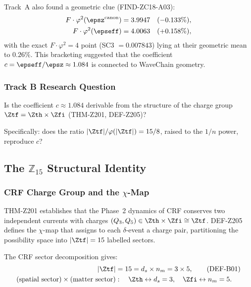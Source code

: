 \documentclass[12pt, a4paper]{article}
\begin{document}
Track~A also found a geometric clue (FIND-ZC18-A03):
\begin{align}
  F\cdot\varphi^2(\epsz^{\rm canon}) &= 3.9947 \quad (-0.133\%),
  \notag\\
  F\cdot\varphi^2(\epseff) &= 4.0063 \quad (+0.158\%),
  \notag
\end{align}
with the exact $F\cdot\varphi^2=4$ point (SC3 $= 0.007843$) lying at
their geometric mean to $0.26\%$.
This bracketing suggested that the coefficient
$c = \epseff/\epsz \approx 1.084$ is connected to WaveChain geometry.

\subsubsection{Track B Research Question}

\begin{formalbox}[title={Track B Question (from ZC18 Track~A, CONJ-ZC18-A01)}]
Is the coefficient $c \approx 1.084$ derivable from the
structure of the charge group $\Ztf = \Zth\times\Zfi$
(THM-Z201, DEF-Z205)?

Specifically: does the ratio $|\Ztf|/\varphi(|\Ztf|) = 15/8$,
raised to the $1/n$ power, reproduce $c$?
\end{formalbox}

\subsection{The $\mathbb{Z}_{15}$ Structural Identity}
\label{zc18b:sec:z15}

\subsubsection{CRF Charge Group and the $\chi$-Map}

THM-Z201 establishes that the Phase~2 dynamics of CRF conserves two
independent currents with charges $(Q_3, Q_5)\in\Zth\times\Zfi\cong\Ztf$.
DEF-Z205 defines the $\chi$-map that assigns to each $\delta$-event a
charge pair, partitioning the possibility space into $|\Ztf|=15$ labelled
sectors.

The CRF sector decomposition gives:
\begin{align}
  |\Ztf| &= 15 = d_s \times n_m = 3\times 5,
  \tag{DEF-B01}\label{zc18b:eq:z15-card}\\
  \text{(spatial sector)}\times\text{(matter sector)}&: \quad
  \Zth \leftrightarrow d_s=3, \quad \Zfi \leftrightarrow n_m=5.
  \notag
\end{align}
\end{document}
